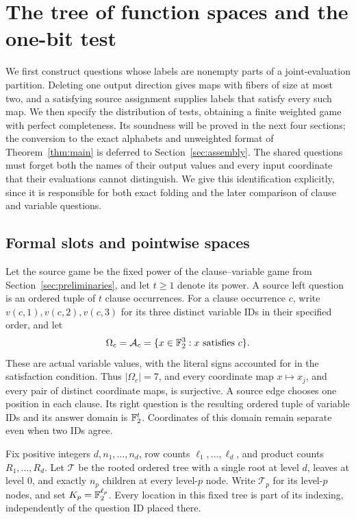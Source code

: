 \section{The tree of function spaces and the one-bit test}
\label{sec:construction}

We first construct questions whose labels are nonempty parts of a joint-evaluation
partition.  Deleting one output direction gives maps with fibers of size at
most two, and a satisfying source assignment supplies labels that satisfy
every such map.  We then specify the distribution of tests, obtaining a
finite weighted game with perfect completeness.  Its soundness will be proved
in the next four sections; the
conversion to the exact alphabets and unweighted format of
Theorem~\ref{thm:main} is deferred to Section~\ref{sec:assembly}.
The shared questions must forget both the names of their output values and
every input coordinate that their evaluations cannot distinguish.  We give
this identification explicitly, since it is responsible for both exact
folding and the later comparison of clause and variable questions.

\subsection{Formal slots and pointwise spaces}

Let the source game be the fixed power of the clause--variable game from
Section~\ref{sec:preliminaries}, and let $t\geq1$ denote its power.
A source left question is an ordered tuple of $t$ clause occurrences.
For a clause occurrence $c$, write $v(c,1),v(c,2),v(c,3)$ for its three
distinct variable IDs in their specified order, and let
\[
 \Omega_c=\mathcal A_c=\{x\in\mathbb F_2^3:x\text{ satisfies }c\}.
\]
These are actual variable values, with the literal signs accounted for in
the satisfaction condition.  Thus $|\Omega_c|=7$, and every coordinate map
$x\mapsto x_j$, and every pair of distinct coordinate maps, is surjective.
A source edge chooses one position in each clause.  Its right question is
the resulting ordered tuple of variable IDs and its answer domain is
$\mathbb F_2^t$.  Coordinates of this domain remain separate even when two IDs agree.

Fix positive integers $d,n_1,\ldots,n_d$, row counts
$\ell_1,\ldots,\ell_d$, and product counts $R_1,\ldots,R_d$.
Let $\mathcal T$ be the rooted ordered tree with a single root at level $d$,
leaves at level $0$, and exactly $n_p$ children at every level-$p$ node.
Write $\mathcal T_p$ for its level-$p$ nodes, and set $K_p=\mathbb F_2^{\ell_p}$.
Every location in this fixed tree is part of its indexing, independently of
the question ID placed there.

